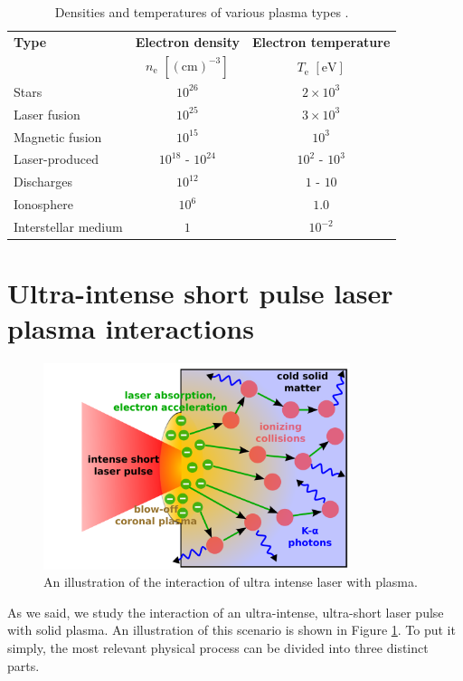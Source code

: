\begin{table}[hb]
	\centering
	\caption{Densities and temperatures of various plasma types \cite{plasma-intro}.}
	\begin{tabular}{lcc}
		\textbf{Type}		& \textbf{Electron density}			 			 	& \textbf{Electron temperature} \\ 
		& $n_\mathrm{e}$ $\left[\mathrm{(cm)}^{-3}\right]$  &  $T_\mathrm{e}$ $\left[\mathrm{eV}\right]$ \\ \hline
		Stars 				& $10^{26}$          	& $2 \times 10^3$       \\
		Laser fusion    	& $10^{25}$           	& $3 \times 10^3$       \\
		Magnetic fusion		& $10^{15}$ 			& $10^3$         		\\
		Laser-produced		& $10^{18}$ - $10^{24}$ & $10^2$ - $10^3$       \\
		Discharges			& $10^{12}$          	& $1$ - $10$         	\\
		Ionosphere		    & $10^6$            	& $1.0$         		\\
		Interstellar medium & $1$               	& $10^{-2}$         	\\ \hline
	\end{tabular}
	\label{tab:den-temp}
\end{table}

\section{Ultra-intense short pulse laser plasma interactions}
\begin{figure}[h]
	\centering
	\includegraphics[width=0.8\textwidth]{figures/laser-plasma-interaction}
	\caption{An illustration of the interaction of ultra intense laser with plasma.}
	\label{fig:laser-plasma-interaction}
\end{figure}
As we said, we study the interaction of an ultra-intense, ultra-short laser pulse with solid plasma. An illustration of this scenario is shown in Figure \ref{fig:laser-plasma-interaction}. To put it simply, the most relevant physical process can be divided into three distinct parts.

